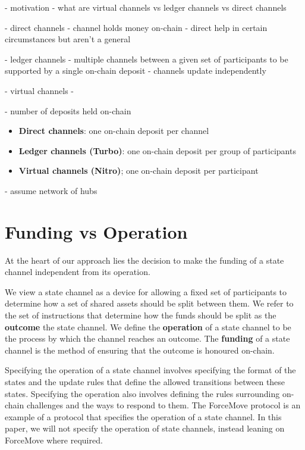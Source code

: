 \documentclass{article}
\begin{document}
- motivation
- what are virtual channels vs ledger channels vs direct channels

- direct channels
- channel holds money on-chain
- direct help in certain circumstances but aren't a general 

- ledger channels
- multiple channels between a given set of participants to be supported by a single on-chain deposit
- channels update independently

- virtual channels
- 

- number of deposits held on-chain
\begin{itemize}
  \item \textbf{Direct channels}: one on-chain deposit per channel
  \item \textbf{Ledger channels (Turbo)}: one on-chain deposit per group of participants
  \item \textbf{Virtual channels (Nitro)}; one on-chain deposit per participant
\end{itemize}

- assume network of hubs

\section{Funding vs Operation}

At the heart of our approach lies the decision to make the funding of a state channel independent from its operation.

We view a state channel as a device for allowing a fixed set of participants to determine how a set of shared assets should be split between them.
We refer to the set of instructions that determine how the funds should be split as the  \textbf{outcome} the state channel.
We define the \textbf{operation} of a state channel to be the process by which the channel reaches an outcome. 
The \textbf{funding} of a state channel is the method of ensuring that the outcome is honoured on-chain.

Specifying the operation of a state channel involves specifying the format of the states and the update rules that define the allowed transitions between these states.
Specifying the operation also involves defining the rules surrounding on-chain challenges and the ways to respond to them.
The ForceMove protocol is an example of a protocol that specifies the operation of a state channel.
In this paper, we will not specify the operation of state channels, instead leaning on ForceMove where required.
\end{document}
